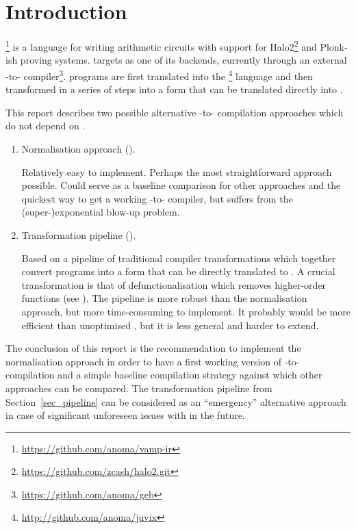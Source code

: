 \documentclass[
    9pt,            %
    techreport,        %
    affiltop,       %
]{art}
\begin{document}
\maketitle
\tableofcontents

\section{Introduction}\label{sec_introduction}

\VampIR{}\footnote{\url{https://github.com/anoma/vamp-ir}} is a language for writing arithmetic
circuits with support for Halo2\footnote{\url{https://github.com/zcash/halo2.git}} and Plonk-ish proving systems. \Juvix{} targets \VampIR{} as one of its backends, currently
through an external \Geb{}-to-\VampIR{} compiler\footnote{\url{https://github.com/anoma/geb}}. \Juvix{} programs are first
translated into the \JuvixCore{}\footnote{\url{http://github.com/anoma/juvix}} language and then transformed in a
series of steps into a form that can be translated directly into \Geb{}.

This report describes two possible alternative \Juvix{}-to-\VampIR{}
compilation approaches which do not depend on \Geb{}.
\begin{enumerate}
\item Normalisation approach ().

   Relatively easy to implement. Perhaps the most straightforward
   approach possible. Could serve as a baseline comparison for other
   approaches and the quickest way to get a working \Juvix{}-to-\VampIR{}
   compiler, but suffers from the (super-)exponential blow-up problem.
\item Transformation pipeline ().

  Based on a pipeline of traditional compiler transformations which
  together convert \JuvixCore{} programs into a form that can be directly
  translated to \VampIR{}. A crucial transformation is that of
  defunctionalisation which removes higher-order functions (see
  ). The pipeline is more robust
  than the normalisation approach, but more time-consuming to
  implement. It probably would be more efficient than unoptimised \Geb{}, but it is less general and harder to extend.
\end{enumerate}

The conclusion of this report is the recommendation to implement the
normalisation approach in order to have a first working version of
\Juvix{}-to-\VampIR{} compilation and a simple baseline compilation strategy
against which other approaches can be compared. The transformation
pipeline from Section~\ref{sec_pipeline} can be considered as an
``emergency'' alternative approach in case of significant unforeseen
issues with \Geb{} in the future.
\end{document}
